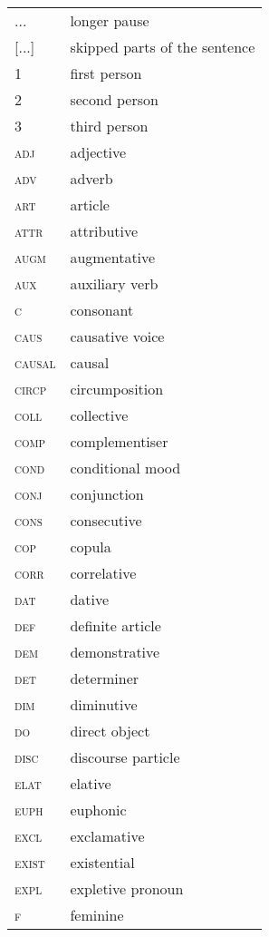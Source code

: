 

\begin{tabularx}{.45\textwidth}{lQ}

... & longer pause\\{}
[...] & skipped parts of the sentence\\

1& first person\\
2 & second person\\
3 & third person\\
\textsc{adj} & adjective\\
\textsc{adv} & adverb\\
\textsc{art} & article\\
\textsc{attr}\footnotemark & attributive\\
\textsc{augm} & augmentative\\
\textsc{aux} & auxiliary verb\\
\textsc{c} & consonant\\
\textsc{caus} & causative voice\\
\textsc{causal} & causal\\
\textsc{circp} & circumposition\\
\textsc{coll} & collective\\
\textsc{comp}\footnotemark & complementiser\\
\textsc{cond} & conditional mood\\
\textsc{conj} & conjunction\\
\textsc{cons} & consecutive\\
\textsc{cop} & copula\\
\textsc{corr} & correlative\\
\textsc{dat} & dative\\
\textsc{def} & definite article\\
\textsc{dem} & demonstrative\\
\textsc{det} & determiner\\
\textsc{dim} & diminutive\\
\textsc{do} & direct object\\
\textsc{disc} & discourse particle\\
\textsc{elat} & elative\\
\textsc{euph} & euphonic\\
\textsc{excl} & exclamative\\
\textsc{exist} & existential\\
\textsc{expl} & expletive pronoun\\
\textsc{f} & feminine\\
\end{tabularx}
